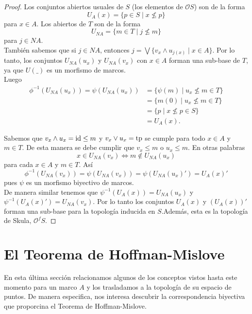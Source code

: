 \begin{proof}
    Los conjuntos abiertos usuales de $S$ (los elementos de $\mathcal{O}S$) son de la forma
    \[
    U_A(x)=\{p\in S\mid x\nleq p\}
    \]
    para $x\in A$. Los abiertos de $T$ son de la forma 
    \[
    U_{NA}=\{m\in T\mid j\nleq m\}
    \]
    para $j\in NA$.\\

    También sabemos que si $j\in NA$, entonces $j=\bigvee\{v_x\wedge u_{j(x)}\mid x\in A\}$. Por lo tanto, los conjuntos $U_{NA}(u_x)$ y $U_{NA}(v_x)$ con $x\in A$ forman una sub-base de $T$, ya que $U( \_ )$ es un morfismo de marcos.\\

    Luego
    \[
    \begin{split}
        \phi^{-1}(U_{NA}(u_x))=\psi (U_{NA}(u_x))&=\{\psi (m)\mid u_x\nleq m \in T\}\\
        &=\{m(0)\mid u_x\nleq m\in T\}\\
        &=\{p\mid x\nleq p\in S\}\\
        &=U_A(x).
    \end{split}
    \]

    Sabemos que $v_x\wedge u_x=\mathrm{id}\leq m$ y $v_x\vee u_x=\mathrm{tp}$ se cumple para todo $x\in A$ y $m\in T$. De esta manera se debe cumplir que $v_x\leq m$ o $u_x\leq m$. En otras palabras
    \[
    x\in U_{NA}(v_x)\Leftrightarrow m\notin U_{NA}(u_x)
    \]
    para cada $x\in A$ y $m\in T$. Así
    \[
    \phi^{-1}(U_{NA}(v_x))=\psi (U_{NA}(v_x))=\psi(U_{NA}(u_x)')=U_A(x)'
    \]
    pues $\psi$ es un morfismo biyectivo de marcos.\\

    De manera similar tenemos que $\psi^{-1}(U_A(x))=U_{NA}(u_x)$ y $\psi^{-1}(U_A(x)')=U_{NA}(v_x)$. Por lo tanto los conjuntos $U_A(x)$ y $(U_A(x))'$ forman una sub-base para la topología inducida en $S$.Además, esta es la topología de Skula, $\mathcal{O}^fS$.
\end{proof}

\section{El Teorema de Hoffman-Mislove}

En esta última sección relacionamos algunos de los conceptos vistos hasta este momento para un marco $A$ y los trasladamos a la topología de su espacio de puntos. De manera especifica, nos interesa descubrir la correspondencia biyectiva que proporcina el Teorema de Hoffman-Mislove.\\

